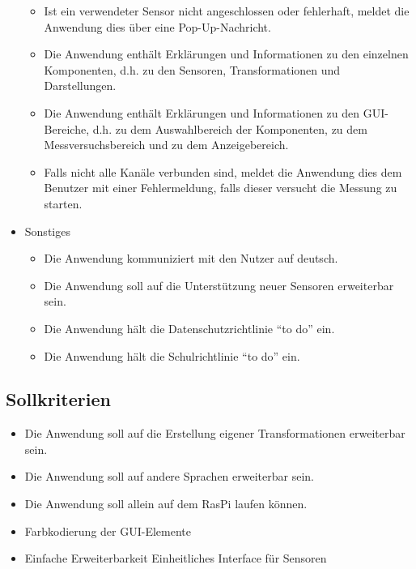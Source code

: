 \documentclass[parskip=full]{scrartcl}
\begin{document}
\begin{itemize}
\begin{itemize}
\item Ist ein verwendeter Sensor nicht angeschlossen oder fehlerhaft, meldet die Anwendung dies über eine Pop-Up-Nachricht.
\item Die Anwendung enthält Erklärungen und Informationen zu den einzelnen Komponenten, d.h. zu den Sensoren, Transformationen und Darstellungen.
\item Die Anwendung enthält Erklärungen und Informationen zu den GUI-Bereiche, d.h. zu dem Auswahlbereich der Komponenten, zu dem Messversuchsbereich und zu dem Anzeigebereich.
\item Falls nicht alle Kanäle verbunden sind, meldet die Anwendung dies dem Benutzer mit einer Fehlermeldung, falls dieser versucht die Messung zu starten. 

\end{itemize}

\item Sonstiges
\begin{itemize}

\item Die Anwendung kommuniziert mit den Nutzer auf deutsch.
\item Die Anwendung soll auf die Unterstützung neuer Sensoren erweiterbar sein.
\item Die Anwendung hält die Datenschutzrichtlinie "`to do"' ein.
\item Die Anwendung hält die Schulrichtlinie "`to do"' ein.

\end{itemize}

 \end{itemize}

\subsection{Sollkriterien}

\begin{itemize}

\item Die Anwendung soll auf die Erstellung eigener Transformationen erweiterbar sein.
\item Die Anwendung soll auf andere Sprachen erweiterbar sein.
\item Die Anwendung soll allein auf dem \gls{RasPi} laufen können.
\item Farbkodierung der GUI-Elemente
\item Einfache Erweiterbarkeit
\subitem Einheitliches Interface für Sensoren


 \end{itemize}
\end{document}
